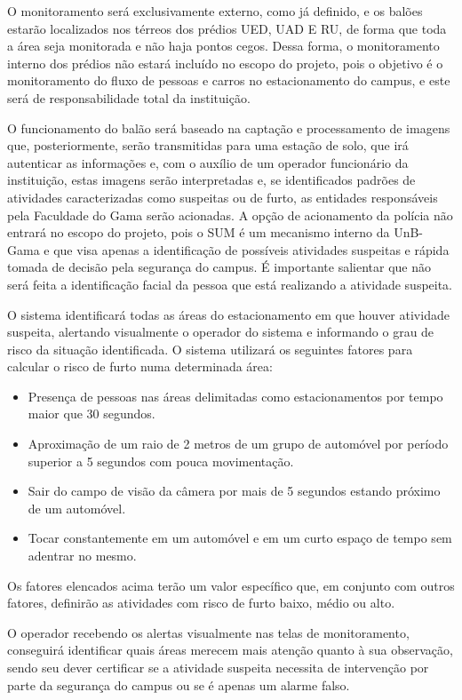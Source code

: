   O monitoramento será exclusivamente externo, como já definido, e os balões estarão localizados nos térreos dos prédios UED, UAD E RU, de forma que toda a área seja monitorada e não haja pontos cegos. Dessa forma, o monitoramento interno dos prédios não estará incluído no escopo do projeto, pois o objetivo é o monitoramento do fluxo de pessoas e carros no estacionamento do campus, e este será de responsabilidade total da instituição.

  O funcionamento do balão será baseado na captação e processamento de imagens que, posteriormente, serão transmitidas para uma estação de solo, que irá autenticar as informações e, com o auxílio de um operador funcionário da instituição, estas imagens serão interpretadas e, se identificados padrões de atividades caracterizadas como suspeitas ou de furto, as entidades responsáveis pela Faculdade do Gama serão acionadas. A opção de acionamento da polícia não entrará no escopo do projeto, pois o SUM é um mecanismo interno da UnB-Gama e que visa apenas a identificação de possíveis atividades suspeitas e rápida tomada de decisão pela segurança do campus. É importante salientar que não será feita a identificação facial da pessoa que está realizando a atividade suspeita.

  O sistema identificará todas as áreas do estacionamento em que houver atividade suspeita, alertando visualmente o operador do sistema e informando o grau de risco da situação identificada. O sistema utilizará os seguintes fatores para calcular o risco de furto numa determinada área:

  \begin{itemize}
    \item Presença de pessoas nas áreas delimitadas como estacionamentos por tempo maior que 30 segundos.
    \item Aproximação de um raio de 2 metros de um grupo de automóvel por período superior a 5 segundos com pouca movimentação.
    \item Sair do campo de visão da câmera por mais de 5 segundos estando próximo de um automóvel.
    \item Tocar constantemente em um automóvel e em um curto espaço de tempo sem adentrar no mesmo.
  \end{itemize}

  Os fatores elencados acima terão um valor específico que, em conjunto com outros fatores, definirão as atividades com risco de furto baixo, médio ou alto.

  O operador recebendo os alertas visualmente nas telas de monitoramento, conseguirá identificar quais áreas merecem mais atenção quanto à sua observação, sendo seu dever certificar se a atividade suspeita necessita de intervenção por parte da segurança do campus ou se é apenas um alarme falso.

